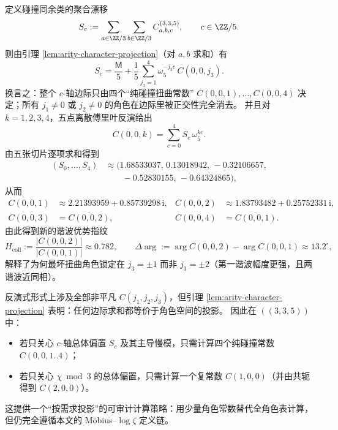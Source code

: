 \begin{corollary}\label{cor:arity-335-marginal-invert-collision}
定义碰撞同余类的聚合漂移
\[
S_c:=\sum_{a\in\ZZ/3}\sum_{b\in\ZZ/3}C^{(3,3,5)}_{a,b,c},
\qquad c\in\ZZ/5.
\]
则由引理 \ref{lem:arity-character-projection}（对 \(a,b\) 求和）有
\[
S_c=\frac{\mathsf{M}}{5}+\frac15\sum_{j_3=1}^{4}\omega_5^{-j_3c}\,C(0,0,j_3).
\]
换言之：整个 \(c\)-轴边际只由四个“纯碰撞扭曲常数” \(C(0,0,1),\dots,C(0,0,4)\) 决定；所有 \(j_1\ne0\) 或 \(j_2\ne0\) 的角色在边际里被正交性完全消去。
并且对 \(k=1,2,3,4\)，五点离散傅里叶反演给出
\[
C(0,0,k)=\sum_{c=0}^{4}S_c\,\omega_5^{kc}.
\]
由五张切片逐项求和得到
\[
\begin{aligned}
(S_0,\dots,S_4)
&\approx(1.68533037,\,0.13018942,\,-0.32106657,\\
&\qquad -0.52830155,\,-0.64324865),
\end{aligned}
\]
从而
\[
\begin{aligned}
C(0,0,1)&\approx 2.21393959+0.85739298\,\mathrm{i},&
C(0,0,2)&\approx 1.83793482+0.25752331\,\mathrm{i},\\
C(0,0,3)&=\overline{C(0,0,2)},&
C(0,0,4)&=\overline{C(0,0,1)}.
\end{aligned}
\]
由此得到新的谐波优势指纹
\[
H_{\mathrm{coll}}:=\frac{|C(0,0,2)|}{|C(0,0,1)|}\approx 0.782,
\qquad
\Delta\arg:=\arg C(0,0,2)-\arg C(0,0,1)\approx 13.2^\circ,
\]
解释了为何最坏扭曲角色锁定在 \(j_3=\pm1\) 而非 \(j_3=\pm2\)（第一谐波幅度更强，且两谐波近同相）。
\end{corollary}

\begin{remark}\label{rem:arity-335-projection-compression}
反演式形式上涉及全部非平凡 \(C(j_1,j_2,j_3)\)，但引理 \ref{lem:arity-character-projection} 表明：任何边际求和都等价于角色空间的投影。
因此在 \(((3,3,5))\) 中：
\begin{itemize}
  \item 若只关心 \(c\)-轴总体偏置 \(S_c\) 及其主导慢模，只需计算四个纯碰撞常数 \(C(0,0,1..4)\)；
  \item 若只关心 \(\chi\bmod 3\) 的总体偏置，只需计算一个复常数 \(C(1,0,0)\)（并由共轭得到 \(C(2,0,0)\)）。
\end{itemize}
这提供一个“按需求投影”的可审计计算策略：用少量角色常数替代全角色表计算，但仍完全遵循本文的 Möbius--\(\log\zeta\) 定义链。
\end{remark}

